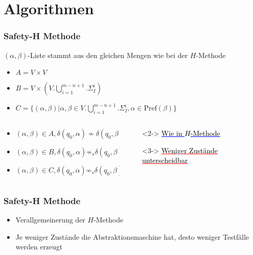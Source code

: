 \section{Algorithmen}
\begin{frame}
    \frametitle{Safety-H Methode}
    $(\alpha, \beta)$-Liste stammt aus den gleichen Mengen wie bei der $H$-Methode
    \begin{itemize}
        \item $A=V\times V$
        \item $B=V\times (V.\bigcup\limits_{i=1}^{m-n+1}.\Sigma_I^i)$
        \item $C=\{(\alpha,\beta)|\alpha,\beta\in V.\bigcup\limits_{i=1}^{m-n+1}.\Sigma_I^i, \alpha \in \text{Pref}(\beta)\}$
      \end{itemize}
    
    \begin{columns}[T] %
    \begin{column}{.50\textwidth}
    \pause
    \begin{itemize}
      \item<2-> $(\alpha, \beta) \in A, \delta(q_0,\alpha) \not \sim \delta(q_0, \beta)$
      \item<3-> $(\alpha, \beta) \in B, \delta(q_0,\alpha) \not \sim_s \delta(q_0, \beta)$
      \item<3-> $(\alpha, \beta) \in C, \delta(q_0,\alpha) \not \sim_s \delta(q_0, \beta)$
    \end{itemize}
      \end{column}%
      \begin{column}{.60\textwidth}
    
      \begin{itemize}
      \item[]<2-> \textcolor{blue}{\underline{\textcolor{black}{Wie in $H$-Methode}}}
      \item[]<3-> \textcolor{red}{\underline{\textcolor{black}{Weniger Zustände unterscheidbar}}}
    \end{itemize}
      \end{column}
    \end{columns}
    \end{frame}
    
    \begin{frame}
    \frametitle{Safety-H Methode}
    \begin{itemize}
      \item Verallgemeinerung der $H$-Methode
      \item Je weniger Zustände die Abstraktionsmaschine hat, desto weniger Testfälle werden erzeugt
    \end{itemize}
    \end{frame}
    
